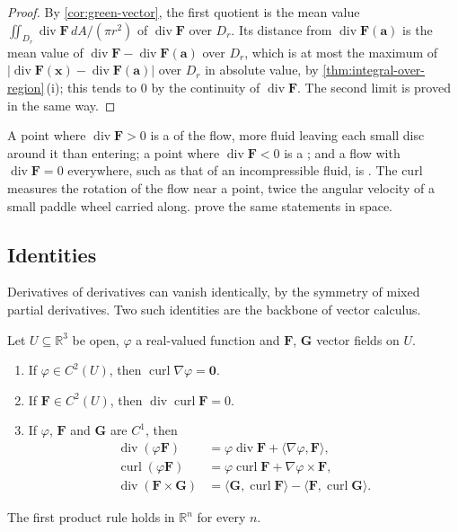 \begin{proof}
By \cref{cor:green-vector}, the first quotient is the mean value $\iint_{D_r}\operatorname{div}\mathbf F\,dA/(\pi r^2)$ of $\operatorname{div}\mathbf F$ over $D_r$. Its distance from $\operatorname{div}\mathbf F(\mathbf a)$ is the mean value of $\operatorname{div}\mathbf F-\operatorname{div}\mathbf F(\mathbf a)$ over $D_r$, which is at most the maximum of $|\operatorname{div}\mathbf F(\mathbf x)-\operatorname{div}\mathbf F(\mathbf a)|$ over $D_r$ in absolute value, by \cref{thm:integral-over-region}\,(i); this tends to $0$ by the continuity of $\operatorname{div}\mathbf F$. The second limit is proved in the same way.
\end{proof}

A point where $\operatorname{div}\mathbf F>0$ is a  of the flow, more fluid leaving each small disc around it than entering; a point where $\operatorname{div}\mathbf F<0$ is a ; and a flow with $\operatorname{div}\mathbf F=0$ everywhere, such as that of an incompressible fluid, is . The curl measures the rotation of the flow near a point, twice the angular velocity of a small paddle wheel carried along.  prove the same statements in space.

\subsection{Identities}

Derivatives of derivatives can vanish identically, by the symmetry of mixed partial derivatives. Two such identities are the backbone of vector calculus.

\begin{proposition}
\label{prop:vector-identities}
Let $U\subseteq\mathbb R^3$ be open, $\varphi$ a real-valued function and $\mathbf F$, $\mathbf G$ vector fields on $U$.
\begin{enumerate}
\item If $\varphi\in C^2(U)$, then $\operatorname{curl}\nabla\varphi=\mathbf0$.
\item If $\mathbf F\in C^2(U)$, then $\operatorname{div}\operatorname{curl}\mathbf F=0$.
\item If $\varphi$, $\mathbf F$ and $\mathbf G$ are $C^1$, then
\begin{align*}
\operatorname{div}(\varphi\mathbf F)&=\varphi\operatorname{div}\mathbf F+\langle\nabla\varphi,\mathbf F\rangle ,\\
\operatorname{curl}(\varphi\mathbf F)&=\varphi\operatorname{curl}\mathbf F+\nabla\varphi\times\mathbf F ,\\
\operatorname{div}(\mathbf F\times\mathbf G)&=\langle\mathbf G,\operatorname{curl}\mathbf F\rangle-\langle\mathbf F,\operatorname{curl}\mathbf G\rangle .
\end{align*}
\end{enumerate}
The first product rule holds in $\mathbb R^n$ for every $n$.
\end{proposition}

